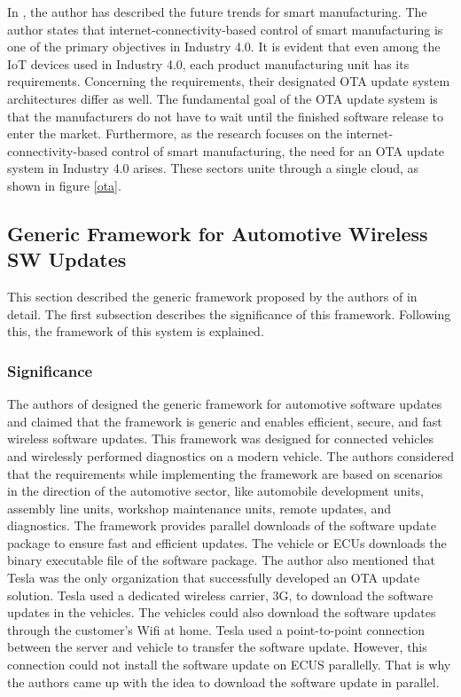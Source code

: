 \documentclass[12pt,a4paper]{article}
\begin{document}
In \cite{r11}, the author has described the future trends for smart manufacturing. The author states that internet-connectivity-based control of smart manufacturing is one of the primary objectives in Industry 4.0. It is evident that even among the IoT devices used in Industry 4.0, each product manufacturing unit has its requirements. Concerning the requirements, their designated OTA update system architectures differ as well. The fundamental goal of the OTA update system is that the manufacturers do not have to wait until the finished software release to enter the market. Furthermore, as the research focuses on the internet-connectivity-based control of smart manufacturing, the need for an OTA update system in Industry 4.0 arises. These sectors unite through a single cloud, as shown in figure \ref{ota}.

\subsection{Generic Framework for Automotive Wireless SW Updates}

This section described the generic framework proposed by the authors of \cite{r3} in detail. The first subsection describes the significance of this framework. Following this, the framework of this system is explained. 

\subsubsection{Significance}

The authors of \cite{r3} designed the generic framework for automotive software updates and claimed that the framework is generic and enables efficient, secure, and fast wireless software updates. This framework was designed for connected vehicles and wirelessly performed diagnostics on a modern vehicle. The authors considered that the requirements while implementing the framework are based on scenarios in the direction of the automotive sector, like automobile development units, assembly line units, workshop maintenance units, remote updates, and diagnostics. The framework provides parallel downloads of the software update package to ensure fast and efficient updates. The vehicle or ECUs downloads the binary executable file of the software package. The author also mentioned that Tesla was the only organization that successfully developed an OTA update solution. Tesla used a dedicated wireless carrier, 3G, to download the software updates in the vehicles. The vehicles could also download the software updates through the customer's Wifi at home. Tesla used a point-to-point connection between the server and vehicle to transfer the software update. However, this connection could not install the software update on ECUS parallelly. That is why the authors came up with the idea to download the software update in parallel.  \cite{r3} \\
\end{document}
